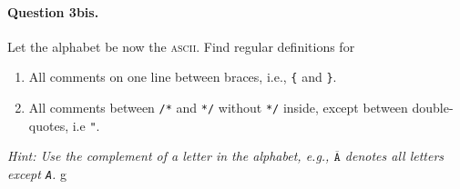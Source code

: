 \paragraph{Question 3bis.} Let the alphabet be now the
\textsc{ascii}. Find regular definitions for
\begin{enumerate}

  \item All comments on one line between braces, i.e., \verb+{+
      and \verb+}+.

  \item All comments between \verb|/*| and \verb|*/| without \verb|*/|
      inside, except between double-quotes, i.e \verb+"+.

\end{enumerate}
\emph{Hint: Use the complement of a letter in the alphabet,
    e.g., \(\overline{\texttt{A}}\) denotes all letters
    except \texttt{A}.}  g
